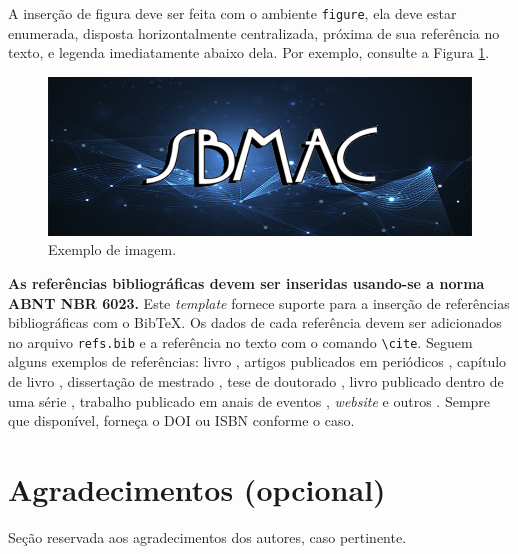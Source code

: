\documentclass{pssbmac}
\begin{document}
A inserção de figura deve ser feita com o ambiente \verb!figure!, ela deve estar enumerada, disposta horizontalmente centralizada, próxima de sua referência no texto, e legenda imediatamente abaixo dela. Por exemplo, consulte a Figura \ref{figura01}.

\begin{figure}[H]
\centering
\includegraphics[width=.5\textwidth]{ex_fig}
\caption{ {\small Exemplo de imagem.}}
\label{figura01}
\end{figure}


{\bf As referências bibliográficas devem ser inseridas usando-se a norma ABNT NBR 6023.} Este {\it template} fornece suporte para a inserção de referências bibliográficas com o Bib\TeX{}. Os dados de cada referência devem ser adicionados no arquivo \verb+refs.bib+ e a referência no texto com o comando \verb+\cite+. Seguem alguns exemplos de referências: livro \cite{Boldrini}, artigos publicados em periódicos \cite{Contiero,Cuminato}, capítulo de livro \cite{daSilva}, dissertação de mestrado \cite{Diniz}, tese de doutorado \cite{Mallet}, livro publicado dentro de uma série \cite{Gomes}, trabalho publicado em anais de eventos \cite{Santos}, {\it website} e outros \cite{CNMAC}. Sempre que disponível, forneça o DOI ou ISBN conforme o caso.


\section*{Agradecimentos (opcional)}
Seção reservada aos agradecimentos dos autores, caso pertinente. 


\printbibliography
\end{document}
